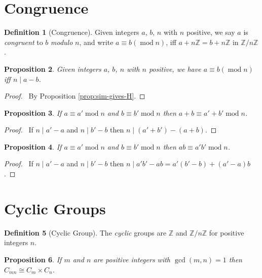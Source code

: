 \documentclass{book}
\let\qed\relax
\newtheorem{prop}{Proposition}[chapter]
\theoremstyle{definition}
\newtheorem{df}[prop]{Definition}
\renewcommand{\mod}{\ensuremath{\operatorname{mod}}}
\begin{document}
\section{Congruence}

\begin{df}[Congruence]
Given integers $a$, $b$, $n$ with $n$ positive, we say $a$ is \emph{congruent} to $b$ \emph{modulo} $n$, and write $a \equiv b (\mod n)$, iff $a + n \mathbb{Z} = b + n \mathbb{Z}$ in $\mathbb{Z} / n \mathbb{Z}$.
\end{df}

\begin{prop}
Given integers $a$, $b$, $n$ with $n$ positive, we have $a \equiv b (\mod n)$ iff $n \mid a - b$.
\end{prop}

\begin{proof}
\pf\ By Proposition \ref{prop:sim-gives-H}. \qed
\end{proof}

\begin{prop}
    If $a \equiv a' \mod n$ and $b \equiv b' \mod n$ then $a + b \equiv a' + b' \mod n$.
\end{prop}

\begin{proof}
    \pf\ If $n \mid a' - a$ and $n \mid b' - b$ then $n \mid (a' + b') - (a + b)$. \qed
\end{proof}

\begin{prop}
    If $a \equiv a' \mod n$ and $b \equiv b' \mod n$ then $ab \equiv a'b' \mod n$.
\end{prop}

\begin{proof}
    \pf\ If $n \mid a' - a$ and $n \mid b' - b$ then $n \mid a'b' - ab = a'(b'-b) + (a'-a)b$. \qed
\end{proof}

\section{Cyclic Groups}

\begin{df}[Cyclic Group]
    The \emph{cyclic} groups are $\mathbb{Z}$ and $\mathbb{Z} / n \mathbb{Z}$ for positive integers $n$.
\end{df}

\begin{prop}
    If $m$ and $n$ are positive integers with $\gcd(m,n) = 1$ then $C_{mn} \cong C_m \times C_n$.
\end{prop}
\end{document}
